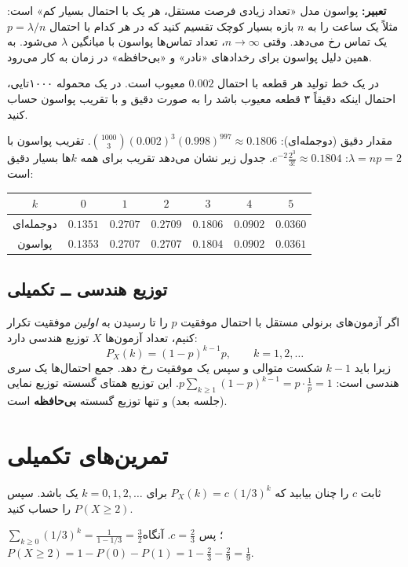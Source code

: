 \begin{note}
\notetitle \textbf{تعبیر:} پواسون مدل «تعداد زیادی فرصت مستقل، هر یک با احتمال بسیار کم» است: مثلاً یک ساعت را به $n$ بازه بسیار کوچک تقسیم کنید که در هر کدام با احتمال $p=\lambda/n$ یک تماس رخ می‌دهد. وقتی $n\to\infty$، تعداد تماس‌ها پواسون با میانگین $\lambda$ می‌شود. به همین دلیل پواسون برای رخدادهای «نادر» و «بی‌حافظه» در زمان به کار می‌رود.
\end{note}

\begin{example}
در یک خط تولید هر قطعه با احتمال $0.002$ معیوب است. در یک محموله ۱۰۰۰تایی، احتمال اینکه دقیقاً ۳ قطعه معیوب باشد را به صورت دقیق و با تقریب پواسون حساب کنید.
\begin{solution}
مقدار دقیق (دوجمله‌ای): $\binom{1000}{3}(0.002)^3(0.998)^{997}\approx0.1806$.
تقریب پواسون با $\lambda=np=2$: $e^{-2}\frac{2^3}{3!}\approx0.1804$.
جدول زیر نشان می‌دهد تقریب برای همه $k$ها بسیار دقیق است:
\begin{center}
\renewcommand{\arraystretch}{1.2}
\begin{tabular}{c|cccccc}
$k$ & $0$ & $1$ & $2$ & $3$ & $4$ & $5$\\\hline
دوجمله‌ای & $0.1351$ & $0.2707$ & $0.2709$ & $0.1806$ & $0.0902$ & $0.0360$\\
پواسون & $0.1353$ & $0.2707$ & $0.2707$ & $0.1804$ & $0.0902$ & $0.0361$
\end{tabular}
\end{center}
\end{solution}
\end{example}

\subsection{توزیع هندسی  ــ تکمیلی}
اگر آزمون‌های برنولی مستقل با احتمال موفقیت $p$ را تا رسیدن به \emph{اولین} موفقیت تکرار کنیم، تعداد آزمون‌ها $X$ توزیع هندسی دارد:
\[
P_X(k)=(1-p)^{k-1}p,\qquad k=1,2,\ldots
\]
زیرا باید $k-1$ شکست متوالی و سپس یک موفقیت رخ دهد. جمع احتمال‌ها یک سری هندسی است: $p\sum_{k\ge1}(1-p)^{k-1}=p\cdot\frac1{p}=1$. این توزیع همتای گسسته توزیع نمایی (جلسه بعد) و تنها توزیع گسسته \textbf{بی‌حافظه} است.

\section{تمرین‌های تکمیلی}

\begin{exercise}
ثابت $c$ را چنان بیابید که $P_X(k)=c\,(1/3)^k$ برای $k=0,1,2,\ldots$ یک  باشد. سپس $P(X\ge2)$ را حساب کنید.
\end{exercise}
\begin{solution}
$\sum_{k\ge0}(1/3)^k=\frac{1}{1-1/3}=\frac32$؛ پس $c=\frac23$. آنگاه
$P(X\ge2)=1-P(0)-P(1)=1-\frac23-\frac29=\frac19$.
\end{solution}

